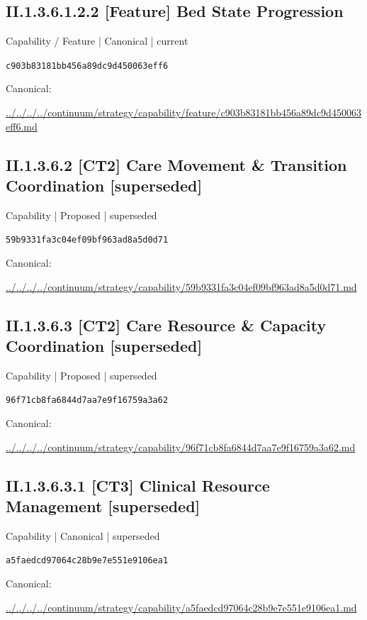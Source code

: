 \documentclass[10pt,a4paper]{article}
\begin{document}
\subsection*{II.1.3.6.1.2.2 [Feature] Bed State Progression}
\label{element-c903b83181bb456a89dc9d450063eff6}
{\small Capability / Feature | Canonical | current}\par
\texttt{c903b83181bb456a89dc9d450063eff6}\par
Canonical: \par
{\footnotesize\url{../../../../continuum/strategy/capability/feature/c903b83181bb456a89dc9d450063eff6.md}}\par
\subsection*{II.1.3.6.2 [CT2] Care Movement \& Transition Coordination [superseded]}
\label{element-59b9331fa3c04ef09bf963ad8a5d0d71}
{\small Capability | Proposed | superseded}\par
\texttt{59b9331fa3c04ef09bf963ad8a5d0d71}\par
Canonical: \par
{\footnotesize\url{../../../../continuum/strategy/capability/59b9331fa3c04ef09bf963ad8a5d0d71.md}}\par
\subsection*{II.1.3.6.3 [CT2] Care Resource \& Capacity Coordination [superseded]}
\label{element-96f71cb8fa6844d7aa7e9f16759a3a62}
{\small Capability | Proposed | superseded}\par
\texttt{96f71cb8fa6844d7aa7e9f16759a3a62}\par
Canonical: \par
{\footnotesize\url{../../../../continuum/strategy/capability/96f71cb8fa6844d7aa7e9f16759a3a62.md}}\par
\subsection*{II.1.3.6.3.1 [CT3] Clinical Resource Management [superseded]}
\label{element-a5faedcd97064c28b9e7e551e9106ea1}
{\small Capability | Canonical | superseded}\par
\texttt{a5faedcd97064c28b9e7e551e9106ea1}\par
Canonical: \par
{\footnotesize\url{../../../../continuum/strategy/capability/a5faedcd97064c28b9e7e551e9106ea1.md}}\par
\end{document}
